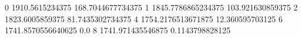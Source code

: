 0 1910.5615234375 168.7044677734375
1 1845.7786865234375 103.921630859375
2 1823.6005859375 81.7435302734375
4 1754.2176513671875 12.360595703125
6 1741.8570556640625 0.0
8 1741.971435546875 0.1143798828125

